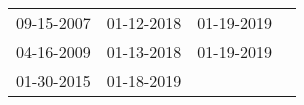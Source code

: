 \begin{supertabular}{llll}
 09-15-2007 &  01-12-2018 &  01-19-2019 \\
 04-16-2009 &  01-13-2018 &  01-19-2019 \\
 01-30-2015 &  01-18-2019 &             \\
\end{supertabular}
